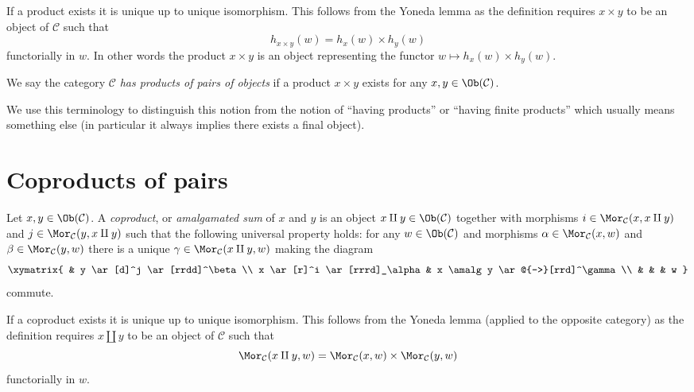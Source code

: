 \noindent
If a product exists it is unique up to unique
isomorphism. This follows from the Yoneda lemma as
the definition requires $x \times y$ to be an object
of $\mathcal{C}$ such that
$$
h_{x \times y}(w) = h_x(w) \times h_y(w)
$$
functorially in $w$. In other words the product $x \times y$
is an object representing the functor
$w \mapsto h_x(w) \times h_y(w)$.

\begin{definition}
\label{definition-has-products-of-pairs}
We say the category $\mathcal{C}$ {\it has products of pairs
of objects} if a product $x \times y$
exists for any $x, y \in \Ob(\mathcal{C})$.
\end{definition}

\noindent
We use this terminology to distinguish this notion from the notion
of ``having products'' or ``having finite products'' which usually means
something else (in particular it always implies there exists a
final object).





\section{Coproducts of pairs}
\label{section-coproducts-pairs}

\begin{definition}
\label{definition-coproducts}
Let $x, y \in \Ob(\mathcal{C})$.
A {\it coproduct}, or {\it amalgamated sum} of $x$ and $y$ is
an object $x \amalg y \in \Ob(\mathcal{C})$
together with morphisms
$i \in \Mor_{\mathcal C}(x, x \amalg y)$ and
$j \in \Mor_{\mathcal C}(y, x \amalg y)$ such
that the following universal property holds: for
any $w \in \Ob(\mathcal{C})$ and morphisms
$\alpha \in \Mor_{\mathcal C}(x, w)$ and
$\beta \in \Mor_\mathcal{C}(y, w)$
there is a unique
$\gamma \in \Mor_{\mathcal C}(x \amalg y, w)$ making
the diagram
$$
\xymatrix{
& y \ar[d]^j \ar[rrdd]^\beta \\
x \ar[r]^i \ar[rrrd]_\alpha & x \amalg y \ar@{-->}[rrd]^\gamma \\
& & & w
}
$$
commute.
\end{definition}

\noindent
If a coproduct exists it is unique up to unique
isomorphism. This follows from the Yoneda lemma (applied to the
opposite category) as
the definition requires $x \amalg y$ to be an object
of $\mathcal{C}$ such that
$$
\Mor_\mathcal{C}(x \amalg y, w) =
\Mor_\mathcal{C}(x, w) \times \Mor_\mathcal{C}(y, w)
$$
functorially in $w$.

